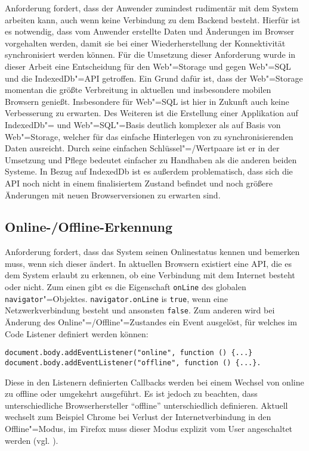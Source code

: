 Anforderung  fordert, dass der Anwender zumindest rudimentär mit dem System arbeiten kann, auch wenn keine Verbindung zu dem Backend besteht. Hierfür ist es notwendig, dass vom Anwender erstellte Daten und Änderungen im Browser vorgehalten werden, damit sie bei einer Wiederherstellung der Konnektivität synchronisiert werden können. Für die Umsetzung dieser Anforderung wurde in dieser Arbeit eine Entscheidung für den Web"=Storage und gegen Web"=\ac{SQL} und die IndexedDb"=\ac{API} getroffen. Ein Grund dafür ist, dass der Web"=Storage momentan die größte Verbreitung in aktuellen und insbesondere mobilen Browsern genießt. Insbesondere für Web"=\ac{SQL} ist hier in Zukunft auch keine Verbesserung zu erwarten. Des Weiteren ist die Erstellung einer Applikation auf IndexedDb"= und Web"=\ac{SQL}"=Basis deutlich komplexer als auf Basis von Web"=Storage, welcher für das einfache Hinterlegen von zu synchronisierenden Daten ausreicht. Durch seine einfachen Schlüssel"=/Wertpaare ist er in der Umsetzung und Pflege bedeutet einfacher zu Handhaben als die anderen beiden Systeme. In Bezug auf IndexedDb ist es außerdem problematisch, dass sich die \ac{API} noch nicht in einem finalisiertem Zustand befindet und noch größere Änderungen mit neuen Browserversionen zu erwarten sind.

\subsection{Online-/Offline-Erkennung}\label{section:online_offline_erkennung}
Anforderung  fordert, dass das System seinen Onlinestatus kennen und bemerken muss, wenn sich dieser ändert. In aktuellen Browsern existiert eine \ac{API}, die es dem System erlaubt zu erkennen, ob eine Verbindung mit dem Internet besteht oder nicht. Zum einen gibt es die Eigenschaft \texttt{onLine} des globalen \texttt{navigator}"=Objektes. \texttt{navigator.onLine} is \texttt{true}, wenn eine Netzwerkverbindung besteht und ansonsten \texttt{false}. Zum anderen wird bei Änderung des Online"=/Offline"=Zustandes ein Event ausgelöst, für welches im Code Listener definiert werden können:
\begin{lstlisting}
document.body.addEventListener("online", function () {...} 
document.body.addEventListener("offline", function () {...}.
\end{lstlisting}          
Diese in den Listenern definierten Callbacks werden bei einem Wechsel von online zu offline oder umgekehrt ausgeführt. Es ist jedoch zu beachten, dass unterschiedliche Browserhersteller "`offline"' unterschiedlich definieren. Aktuell wechselt zum Beispiel Chrome bei Verlust der Internetverbindung in den Offline"=Modus, im Firefox muss dieser Modus explizit vom User angeschaltet werden (vgl. \cite{MozBug2011}).

